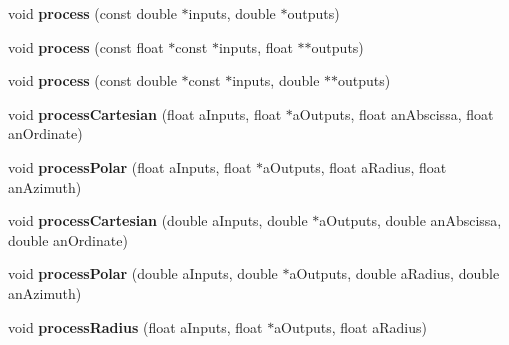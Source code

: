 \begin{DoxyCompactItemize}
\item 
\hypertarget{class_ambisonics_multi_maps_aa955c654fdadaf3f553795a3f6b1211a}{void {\bfseries process} (const double $\ast$inputs, double $\ast$outputs)}\label{class_ambisonics_multi_maps_aa955c654fdadaf3f553795a3f6b1211a}

\item 
\hypertarget{class_ambisonics_multi_maps_aba7d09a43c9991c2205d32af737d6a17}{void {\bfseries process} (const float $\ast$const $\ast$inputs, float $\ast$$\ast$outputs)}\label{class_ambisonics_multi_maps_aba7d09a43c9991c2205d32af737d6a17}

\item 
\hypertarget{class_ambisonics_multi_maps_af1ae8119f22884ed342a627e411990e1}{void {\bfseries process} (const double $\ast$const $\ast$inputs, double $\ast$$\ast$outputs)}\label{class_ambisonics_multi_maps_af1ae8119f22884ed342a627e411990e1}

\item 
\hypertarget{class_ambisonics_multi_maps_a0e80a467c8959d98b6a752e1a89eebb2}{void {\bfseries process\-Cartesian} (float a\-Inputs, float $\ast$a\-Outputs, float an\-Abscissa, float an\-Ordinate)}\label{class_ambisonics_multi_maps_a0e80a467c8959d98b6a752e1a89eebb2}

\item 
\hypertarget{class_ambisonics_multi_maps_a2ac5281bdf765396560ae918e5183916}{void {\bfseries process\-Polar} (float a\-Inputs, float $\ast$a\-Outputs, float a\-Radius, float an\-Azimuth)}\label{class_ambisonics_multi_maps_a2ac5281bdf765396560ae918e5183916}

\item 
\hypertarget{class_ambisonics_multi_maps_a7ee6524be2308c6a0cac03f464d03546}{void {\bfseries process\-Cartesian} (double a\-Inputs, double $\ast$a\-Outputs, double an\-Abscissa, double an\-Ordinate)}\label{class_ambisonics_multi_maps_a7ee6524be2308c6a0cac03f464d03546}

\item 
\hypertarget{class_ambisonics_multi_maps_a4ec92455f3ef2aaa102701ba5bf9b49a}{void {\bfseries process\-Polar} (double a\-Inputs, double $\ast$a\-Outputs, double a\-Radius, double an\-Azimuth)}\label{class_ambisonics_multi_maps_a4ec92455f3ef2aaa102701ba5bf9b49a}

\item 
\hypertarget{class_ambisonics_multi_maps_a7a1506aac60606d11aa75e6c66230d00}{void {\bfseries process\-Radius} (float a\-Inputs, float $\ast$a\-Outputs, float a\-Radius)}\label{class_ambisonics_multi_maps_a7a1506aac60606d11aa75e6c66230d00}


\end{DoxyCompactItemize}
